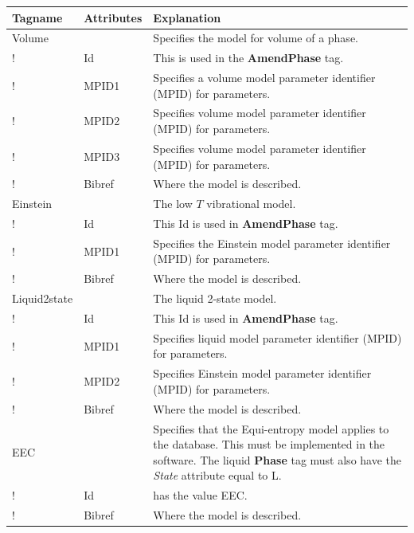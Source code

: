 \documentclass{article}
\begin{document}
\bigskip
\begin{tabular}{|p{} p{} p{}|}\hline
  Tagname& Attributes & Explanation\\\hline

    Volume & & Specifies the model for volume of a phase.\\
!      & Id & This is used in the {\bf AmendPhase} tag.\\
!      & MPID1 & Specifies a volume model parameter identifier
                    (MPID) for parameters.\\
!      & MPID2 & Specifies volume model parameter identifier
                    (MPID) for parameters.\\
!      & MPID3 & Specifies volume model parameter identifier
                    (MPID) for parameters.\\
!      & Bibref & Where the model is described.\\\hline

  Einstein & & The low $T$ vibrational model.\\
!      & Id & This Id is used in {\bf AmendPhase} tag.\\
!      & MPID1 & Specifies the Einstein model parameter identifier (MPID)
          for parameters.\\
!      & Bibref & Where the model is described.\\\hline

  Liquid2state & & The liquid 2-state model.\\
!      & Id & This Id is used in {\bf AmendPhase} tag.\\
!      & MPID1 & Specifies liquid model parameter identifier (MPID)
         for parameters.\\
!      & MPID2 & Specifies Einstein model parameter identifier (MPID)
         for parameters.\\
!      & Bibref & Where the model is described.\\\hline

  EEC & & Specifies that the Equi-entropy model applies to the database.
          This must be implemented in the software.  The liquid 
         {\bf Phase} tag must also have the {\em State} attribute equal to L. \\
!      & Id     & has the value EEC.\\
!      & Bibref & Where the model is described.\\\hline

\end{tabular}
\end{document}
